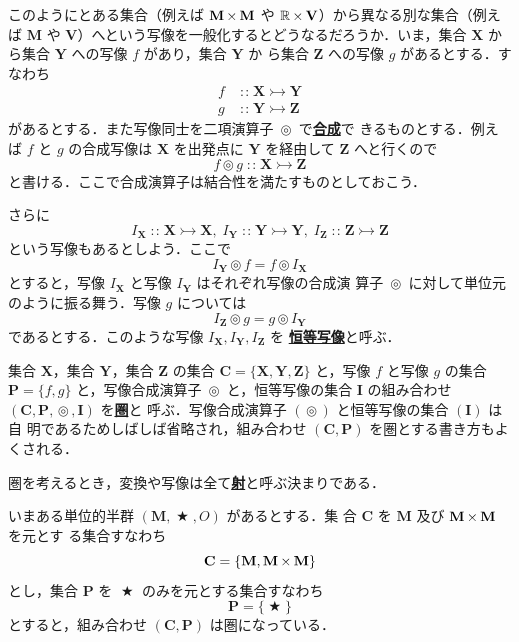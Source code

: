 \documentclass[a5paper,twoside,fleqn,draft]{jsbook}
\newcommand{\keyword}[1]{{\underline{\textbf{#1}}}}
\DeclareMathOperator{\mBinOp}{\bigstar}
\DeclareMathOperator{\mCompProj}{\circledcirc}
\DeclareMathOperator{\mIn}{{:\!:}}
\DeclareMathOperator{\mMorphTo}{\rightarrowtail} %
\DeclareMathOperator{\mSetTimes}{\boldmath{\times}} %
\newcommand{\mSet}[1]{\mathbf{#1}}
\newcommand{\mSpecialSet}[1]{\mathbb{#1}}
\newcommand{\mRSet}{\mSpecialSet{R}}
\newcommand{\mTupleWith}[1]{\left(#1\right)} %
\newcommand{\mMorph}[2]{#1\mMorphTo#2} %
\begin{document}
このようにとある集合（例えば $\mSet{M}\mSetTimes\mSet{M}$ や
$\mRSet\mSetTimes\mSet{V}$）から異なる別な集合（例えば $\mSet{M}$ や
$\mSet{V}$）へという写像を一般化するとどうなるだろうか．いま，集合
$\mSet{X}$ から集合 $\mSet{Y}$ への写像 $f$ があり，集合 $\mSet{Y}$ か
ら集合 $\mSet{Z}$ への写像 $g$ があるとする．すなわち
\begin{align}
f&\mIn\mMorph{\mSet{X}}{\mSet{Y}}\\
g&\mIn\mMorph{\mSet{Y}}{\mSet{Z}}
\end{align}
があるとする．また写像同士を二項演算子 $\mCompProj$ で\keyword{合成}で
きるものとする．例えば $f$ と $g$ の合成写像は $\mSet{X}$ を出発点に
$\mSet{Y}$ を経由して $\mSet{Z}$ へと行くので
\begin{equation}
f\mCompProj g\mIn\mMorph{\mSet{X}}{\mSet{Z}}
\end{equation}
と書ける．ここで合成演算子は結合性を満たすものとしておこう．

さらに
\begin{equation}
I_\mSet{X}\mIn\mMorph{\mSet{X}}{\mSet{X}},\;
I_\mSet{Y}\mIn\mMorph{\mSet{Y}}{\mSet{Y}},\;
I_\mSet{Z}\mIn\mMorph{\mSet{Z}}{\mSet{Z}}
\end{equation}
という写像もあるとしよう．ここで
\begin{equation}
I_\mSet{Y}\mCompProj f=f\mCompProj I_\mSet{X}
\end{equation}
とすると，写像 $I_\mSet{X}$ と写像 $I_\mSet{Y}$ はそれぞれ写像の合成演
算子 $\mCompProj$ に対して単位元のように振る舞う．写像 $g$ については
\begin{equation}
I_\mSet{Z}\mCompProj g=g\mCompProj I_\mSet{Y}
\end{equation}
であるとする．このような写像 $I_\mSet{X},I_\mSet{Y},I_\mSet{Z}$ を
\keyword{恒等写像}と呼ぶ．

集合 $\mSet{X}$，集合 $\mSet{Y}$，集合 $\mSet{Z}$ の集合
$\mSet{C}=\{\mSet{X},\mSet{Y},\mSet{Z}\}$ と，写像 $f$ と写像
$g$ の集合 $\mSet{P}=\{f,g\}$ と，写像合成演算子 $\mCompProj$
と，恒等写像の集合 $\mSet{I}$ の組み合わせ
$\mTupleWith{\mSet{C},\mSet{P},\mCompProj,\mSet{I}}$ を\keyword{圏}と
呼ぶ．写像合成演算子 $(\mCompProj)$ と恒等写像の集合 $(\mSet{I})$ は自
明であるためしばしば省略され，組み合わせ
$\mTupleWith{\mSet{C},\mSet{P}}$ を圏とする書き方もよくされる．

圏を考えるとき，変換や写像は全て\keyword{射}と呼ぶ決まりである．

いまある単位的半群 $\mTupleWith{\mSet{M},\mBinOp,O}$ があるとする．集
合 $\mSet{C}$ を $\mSet{M}$ 及び $\mSet{M}\mSetTimes\mSet{M}$ を元とす
る集合すなわち
\begin{equation}
\mSet{C}=\{\mSet{M},\mSet{M}\mSetTimes\mSet{M}\}
\end{equation}
とし，集合 $\mSet{P}$ を $\mBinOp$ のみを元とする集合すなわち
\begin{equation}
\mSet{P}=\{\mBinOp\}
\end{equation}
とすると，組み合わせ $\mTupleWith{\mSet{C},\mSet{P}}$ は圏になっている．
\end{document}
